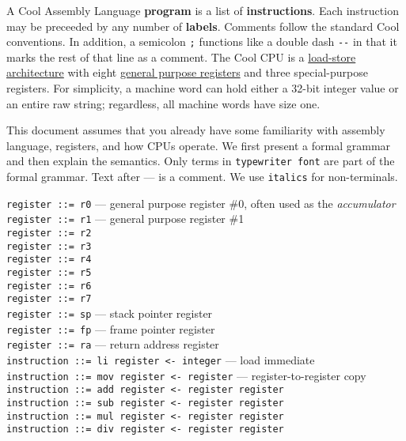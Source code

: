 \documentclass[]{article}
\begin{document}
A Cool Assembly Language \textbf{program} is a list of
\textbf{instructions}. Each instruction may be preceeded by any number
of \textbf{labels}. Comments follow the standard Cool conventions. In
addition, a semicolon \texttt{;} functions like a double dash
\texttt{-{}-} in that it marks the rest of that line as a comment. The
Cool CPU is a \href{http://en.wikipedia.org/wiki/RISC}{load-store
architecture} with eight
\href{http://en.wikipedia.org/wiki/General_purpose_register}{general
purpose registers} and three special-purpose registers. For simplicity,
a machine word can hold either a 32-bit integer value or an entire raw
string; regardless, all machine words have size one.

This document assumes that you already have some familiarity with
assembly language, registers, and how CPUs operate. We first present a
formal grammar and then explain the semantics. Only terms in
\texttt{typewriter font} are part of the formal grammar. Text after ---
is a comment. We use \texttt{italics} for non-terminals.

\texttt{register ::= r0} --- general purpose register \#0, often used as
the \emph{accumulator}\\ \texttt{register ::= r1} --- general purpose
register \#1 \\ \texttt{register ::= r2}\\ \texttt{register ::= r3}\\
\texttt{register ::= r4}\\ \texttt{register ::= r5}\\
\texttt{register ::= r6}\\ \texttt{register ::= r7}\\
\texttt{register ::= sp} --- stack pointer register\\
\texttt{register ::= fp} --- frame pointer register\\
\texttt{register ::= ra} --- return address register\\

\texttt{instruction ::= li  register \textless{}- integer} --- load
immediate \\ \texttt{instruction ::= mov register \textless{}- register}
--- register-to-register copy \\
\texttt{instruction ::= add register \textless{}- register register}\\
\texttt{instruction ::= sub register \textless{}- register register}\\
\texttt{instruction ::= mul register \textless{}- register register}\\
\texttt{instruction ::= div register \textless{}- register register}\\
\end{document}
